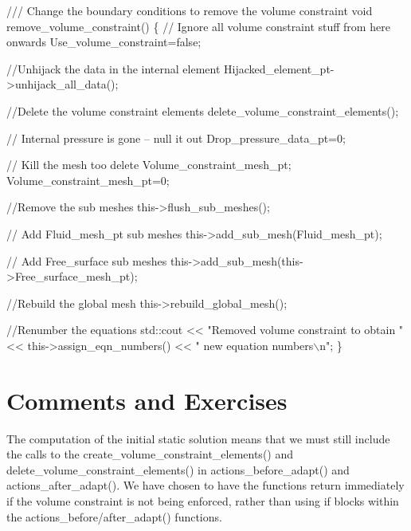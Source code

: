  
\begin{DoxyCodeInclude}
 \textcolor{comment}{/// Change the boundary conditions to remove the volume constraint}
 \textcolor{keywordtype}{void} remove\_volume\_constraint()
  \{
   \textcolor{comment}{// Ignore all volume constraint stuff from here onwards}
   Use\_volume\_constraint=\textcolor{keyword}{false};

   \textcolor{comment}{//Unhijack the data in the internal element}
   Hijacked\_element\_pt->unhijack\_all\_data();

   \textcolor{comment}{//Delete the volume constraint elements}
   delete\_volume\_constraint\_elements();

   \textcolor{comment}{// Internal pressure is gone -- null it out}
   Drop\_pressure\_data\_pt=0;

   \textcolor{comment}{// Kill the mesh too}
   \textcolor{keyword}{delete} Volume\_constraint\_mesh\_pt;
   Volume\_constraint\_mesh\_pt=0;

   \textcolor{comment}{//Remove the sub meshes}
   this->flush\_sub\_meshes();

    \textcolor{comment}{// Add Fluid\_mesh\_pt sub meshes}
   this->add\_sub\_mesh(Fluid\_mesh\_pt);

    \textcolor{comment}{// Add Free\_surface sub meshes}
   this->add\_sub\_mesh(this->Free\_surface\_mesh\_pt);

   \textcolor{comment}{//Rebuild the global mesh}
   this->rebuild\_global\_mesh();
   
   \textcolor{comment}{//Renumber the equations}
   std::cout << \textcolor{stringliteral}{"Removed volume constraint to obtain "}
             << this->assign\_eqn\_numbers() << \textcolor{stringliteral}{" new equation numbers\(\backslash\)n"};
  \}

\end{DoxyCodeInclude}




 

\hypertarget{index_comments}{}\section{Comments and Exercises}\label{index_comments}
The computation of the initial static solution means that we must still include the calls to the {\ttfamily create\+\_\+volume\+\_\+constraint\+\_\+elements()} and {\ttfamily delete\+\_\+volume\+\_\+constraint\+\_\+elements()} in {\ttfamily actions\+\_\+before\+\_\+adapt()} and {\ttfamily actions\+\_\+after\+\_\+adapt()}. We have chosen to have the functions return immediately if the volume constraint is not being enforced, rather than using {\ttfamily if} blocks within the {\ttfamily actions\+\_\+before/after\+\_\+adapt}() functions.



